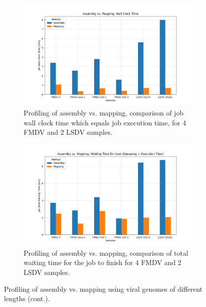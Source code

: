\begin{figure}[ht!]\ContinuedFloat
    \centering
	\begin{subfigure}[b]{1.0\textwidth}
        \includegraphics[width=1.0\textwidth]{media/4-profiling-wallclock.png}
        \caption{Profiling of assembly vs. mapping, comparison of job wall clock time which equals job execution time, for 4 FMDV and 2 LSDV samples.}
        \label{fig:4-profiling-wallclock}
    \end{subfigure}
	\begin{subfigure}[b]{1.0\textwidth}
        \includegraphics[width=1.0\textwidth]{media/4-profiling-total.png}
        \caption{Profiling of assembly vs. mapping, comparison of total waiting time for the job to finish for 4 FMDV and 2 LSDV samples.}
        \label{fig:4-profiling-total}
    \end{subfigure}
    \caption[Profiling of assembly vs. mapping (cont.).]{Profiling of assembly vs. mapping using viral genomes of different lengths (cont.).}
    \label{fig:apx-profiling}
\end{figure}
